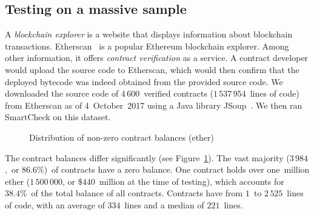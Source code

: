 \subsection{Testing on a massive sample} \label{MassiveTesting}

A \textit{blockchain explorer} is a website that displays information about blockchain transactions.
Etherscan~\cite{EtherscanVerified} is a popular Ethereum blockchain explorer.
Among other information, it offers \textit{contract verification} as a service.
A contract developer would upload the source code to Etherscan, which would then confirm that the deployed bytecode was indeed obtained from the provided source code.
We downloaded the source code of $4\,600$~verified contracts ($1\,537\,954$~lines of code) from Etherscan as of 4~October~2017 using a Java library JSoup~\cite{JSoup}.
We then ran SmartCheck on this dataset.

\begin{figure}
	\caption{Distribution of non-zero contract balances (ether)}
	\centering
	\label{BalancesFigure}
\end{figure}

The contract balances differ significantly (see Figure~\ref{BalancesFigure}).
The vast majority ($3\,984$,~or $86.6\%$)~of contracts have a zero balance.
One contract holds over one~million ether ($1\,500\,000$, or \$$440$~million at the time of testing), which accounts for~$38.4\%$~of the total balance of all contracts.
Contracts have from $1$~to $2\,525$~lines of code, with an average of $334$~lines and a median of $221$~lines.

